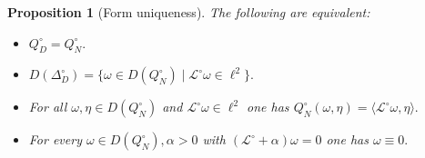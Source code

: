 \documentclass[10pt]{amsart}
\newtheorem{proposition}[theorem]{Proposition}
\theoremstyle{definition}
\renewcommand{\bullet}{{\circ}}
\begin{document}
\begin{proposition}[Form uniqueness]\label{formeq}
    The following are equivalent:
    \begin{itemize}
        \item[(i)] $Q^\bullet_{D} = Q^\bullet_N.$
        \item[(ii)] $D(\Delta^\bullet_{D}) = \lbrace \omega\in D(Q^\bullet_N)\mid\mathcal{L}^\bullet\omega\in\ell^2\rbrace.$
        \item[(iii)] For all $\omega,\eta\in D(Q^\bullet_N)$ and $\mathcal{L}^\bullet\omega\in\ell^2$ one has $Q^\bullet_N(\omega,\eta) = \langle\mathcal{L}^\bullet\omega,\eta\rangle.$
        \item[(iv)] For every $\omega\in D(Q^\bullet_N),\alpha>0$ with $(\mathcal{L}^\bullet+\alpha)\omega = 0$ one has $\omega\equiv 0.$
       \end{itemize}
\end{proposition}
\end{document}
